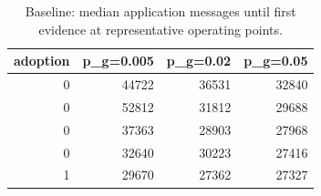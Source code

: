 \begin{table}
\caption{Baseline: median application messages until first evidence at representative operating points.}
\label{tab:baseline-msgs}
\begin{tabular}{rrrr}
\toprule
adoption & p_g=0.005 & p_g=0.02 & p_g=0.05 \\
\midrule
0 & 44722 & 36531 & 32840 \\
0 & 52812 & 31812 & 29688 \\
0 & 37363 & 28903 & 27968 \\
0 & 32640 & 30223 & 27416 \\
1 & 29670 & 27362 & 27327 \\
\bottomrule
\end{tabular}
\end{table}

